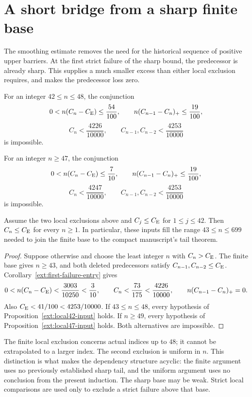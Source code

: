\section{A short bridge from a sharp finite base}
\label{ext:bridge}

The smoothing estimate removes the need for the historical sequence of
positive upper barriers. At the first strict failure of the sharp bound,
the predecessor is already sharp. This supplies a much smaller excess
than either local exclusion requires, and makes the predecessor loss zero.

\begin{proposition}
\label{ext:local42-input}
For an integer $42\le n\le48$, the conjunction
\[
 0<n(C_n-C_{\mathrm E})\le\frac{54}{100},\qquad
 n(C_{n-1}-C_n)_+\le\frac{19}{100},
\]
\[
 C_n<\frac{4226}{10000},\qquad
 C_{n-1},C_{n-2}<\frac{4253}{10000}
\]
is impossible.
\end{proposition}

\begin{proposition}
\label{ext:local47-input}
For an integer $n\ge47$, the conjunction
\[
 0<n(C_n-C_{\mathrm E})\le\frac7{10},\qquad
 n(C_{n-1}-C_n)_+\le\frac{19}{100},
\]
\[
 C_n<\frac{4247}{10000},\qquad
 C_{n-1},C_{n-2}<\frac{4253}{10000}
\]
is impossible.
\end{proposition}

\begin{theorem}
\label{ext:bridge-composition}
Assume the two local exclusions above and $C_j\le C_{\mathrm E}$ for
$1\le j\le42$. Then $C_n\le C_{\mathrm E}$ for every $n\ge1$.
In particular, these inputs fill the range $43\le n\le699$ needed
to join the finite base to the compact manuscript's tail theorem.
\end{theorem}
\begin{proof}
Suppose otherwise and choose the least integer $n$ with $C_n>C_{\mathrm E}$.
The finite base gives $n\ge43$, and both deleted predecessors satisfy
$C_{n-1},C_{n-2}\le C_{\mathrm E}$. Corollary~\ref{ext:first-failure-entry} gives
\[
 0<n(C_n-C_{\mathrm E})<\frac{3003}{10250}<\frac3{10},
 \qquad C_n<\frac{73}{175}<\frac{4226}{10000},
 \qquad n(C_{n-1}-C_n)_+=0.
\]
Also $C_{\mathrm E}<41/100<4253/10000$. If $43\le n\le48$, every
hypothesis of Proposition~\ref{ext:local42-input} holds. If $n\ge49$,
every hypothesis of Proposition~\ref{ext:local47-input} holds.
Both alternatives are impossible.
\end{proof}

The finite local exclusion concerns actual indices up to $48$; it
cannot be extrapolated to a larger index. The second exclusion is
uniform in $n$. This distinction is what makes the dependency structure
acyclic: the finite argument uses no previously established sharp tail,
and the uniform argument uses no conclusion from the present induction.
The sharp base may be weak. Strict local comparisons are used only to
exclude a strict failure above that base.
